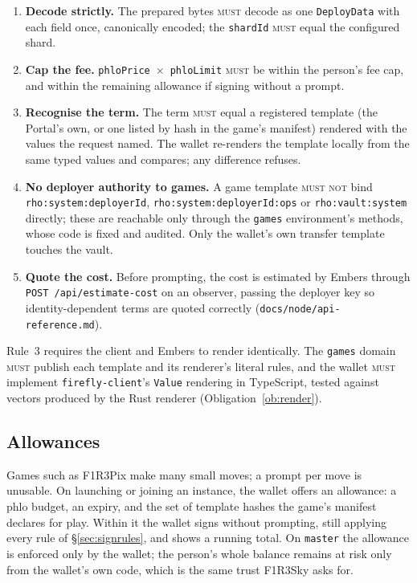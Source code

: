 \documentclass[11pt]{article}
\theoremstyle{definition}
\theoremstyle{remark}
\newcommand{\MUST}{\textsc{must}}
\newcommand{\MUSTNOT}{\textsc{must not}}
\newcommand{\code}[1]{\texttt{#1}}
\newcommand{\Em}{Embers}
\newcommand{\Sky}{F1R3Sky}
\begin{document}
\begin{enumerate}[leftmargin=*,itemsep=2pt]
\item \textbf{Decode strictly.} The prepared bytes \MUST{} decode as one
  \code{DeployData} with each field once, canonically encoded; the \code{shardId}
  \MUST{} equal the configured shard.
\item \textbf{Cap the fee.} \code{phloPrice}~$\times$~\code{phloLimit} \MUST{} be
  within the person's fee cap, and within the remaining allowance if signing without
  a prompt.
\item \textbf{Recognise the term.} The term \MUST{} equal a registered template
  (the Portal's own, or one listed by hash in the game's manifest) rendered with the
  values the request named. The wallet re-renders the template locally from the
  same typed values and compares; any difference refuses.
\item \textbf{No deployer authority to games.} A game template \MUSTNOT{} bind
  \code{rho:system:deployerId}, \code{rho:system:deployerId:ops} or
  \code{rho:vault:system} directly; these are reachable only through the
  \code{games} environment's methods, whose code is fixed and audited. Only the
  wallet's own transfer template touches the vault.
\item \textbf{Quote the cost.} Before prompting, the cost is estimated by \Em{}
  through \code{POST /api/estimate-cost} on an observer, passing the deployer key so
  identity-dependent terms are quoted correctly (\code{docs/node/api-reference.md}).
\end{enumerate}

Rule~3 requires the client and \Em{} to render identically. The \code{games} domain
\MUST{} publish each template and its renderer's literal rules, and the wallet
\MUST{} implement \code{firefly-client}'s \code{Value} rendering in TypeScript,
tested against vectors produced by the Rust renderer (Obligation~\ref{ob:render}).

\subsection{Allowances}\label{sec:allowance}

Games such as F1R3Pix make many small moves; a prompt per move is unusable. On
launching or joining an instance, the wallet offers an allowance: a phlo budget, an
expiry, and the set of template hashes the game's manifest declares for play. Within
it the wallet signs without prompting, still applying every rule of
\S\ref{sec:signrules}, and shows a running total. On \code{master} the allowance is
enforced only by the wallet; the person's whole balance remains at risk only from the
wallet's own code, which is the same trust \Sky{} asks for.
\end{document}
